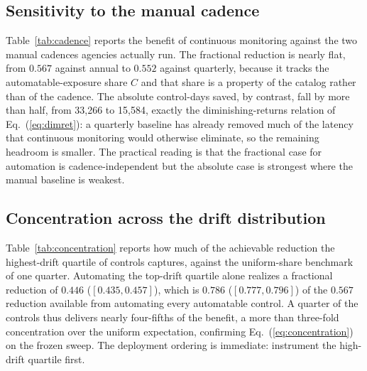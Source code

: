 \documentclass[journal]{IEEEtran}
\begin{document}
\subsection{Sensitivity to the manual cadence}
Table~\ref{tab:cadence} reports the benefit of continuous monitoring against the two manual cadences
agencies actually run. The fractional reduction is nearly flat, from $0.567$ against annual to
$0.552$ against quarterly, because it tracks the automatable-exposure share $C$ and that share is a
property of the catalog rather than of the cadence. The absolute control-days saved, by contrast,
fall by more than half, from 33{,}266 to 15{,}584, exactly the diminishing-returns relation of
Eq.~(\ref{eq:dimret}): a quarterly baseline has already removed much of the latency that continuous
monitoring would otherwise eliminate, so the remaining headroom is smaller. The practical reading is
that the fractional case for automation is cadence-independent but the absolute case is strongest
where the manual baseline is weakest.

\begin{table}[t]
\centering
\caption{Sensitivity to the manual baseline cadence (mean over 25 seeds, 95\% BCa interval). The
fractional reduction tracks the automatable share and is nearly flat; the absolute control-days
saved diminish as the cadence tightens.}
\label{tab:cadence}
\footnotesize
\setlength{\tabcolsep}{4pt}
\end{table}

\subsection{Concentration across the drift distribution}
Table~\ref{tab:concentration} reports how much of the achievable reduction the highest-drift
quartile of controls captures, against the uniform-share benchmark of one quarter. Automating the
top-drift quartile alone realizes a fractional reduction of $0.446$ ($[0.435, 0.457]$), which is
$0.786$ ($[0.777, 0.796]$) of the $0.567$ reduction available from automating every automatable
control. A quarter of the controls thus delivers nearly four-fifths of the benefit, a more than
three-fold concentration over the uniform expectation, confirming Eq.~(\ref{eq:concentration}) on
the frozen sweep. The deployment ordering is immediate: instrument the high-drift quartile first.
\end{document}
